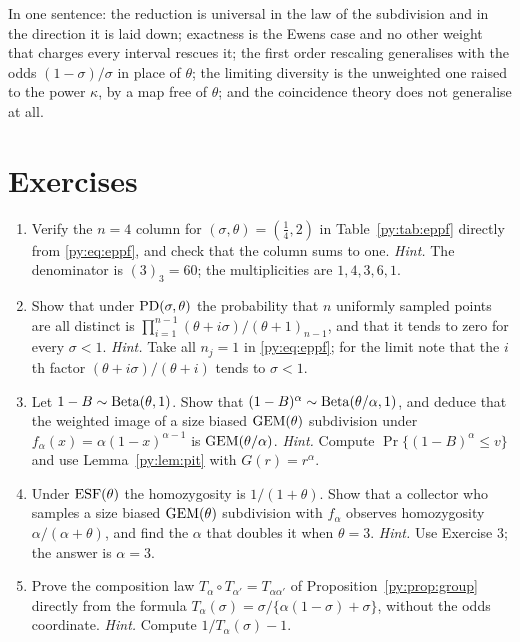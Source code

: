 In one sentence: the reduction is universal in the law of the subdivision and in the direction it
is laid down; exactness is the Ewens case and no other weight that charges every interval rescues it; the first order rescaling
generalises with the odds $(1-\sigma)/\sigma$ in place of $\theta$; the limiting diversity is the
unweighted one raised to the power $\kappa$, by a map free of $\theta$; and the coincidence theory
does not generalise at all.

\section{Exercises}
\label{py:sec:exercises}

\begin{enumerate}[label=\arabic*., leftmargin=*]
\item Verify the $n = 4$ column for $(\sigma,\theta) = (\tfrac14,2)$ in Table~\ref{py:tab:eppf}
directly from \eqref{py:eq:eppf}, and check that the column sums to one.
\emph{Hint.} The denominator is $(3)_3 = 60$; the multiplicities are $1, 4, 3, 6, 1$.

\item Show that under $\mathrm{PD}(\sigma,\theta)$ the probability that $n$ uniformly sampled points are all
distinct is $\prod_{i=1}^{n-1}(\theta+i\sigma)/(\theta+1)_{n-1}$, and that it tends to zero for
every $\sigma < 1$.
\emph{Hint.} Take all $n_j = 1$ in \eqref{py:eq:eppf}; for the limit note that the
$i$th factor $(\theta+i\sigma)/(\theta+i)$ tends to $\sigma < 1$.

\item Let $1-B \sim \mathrm{Beta}(\theta,1)$. Show that $(1-B)^{\alpha} \sim \mathrm{Beta}(\theta/\alpha,1)$, and
deduce that the weighted image of a size biased $\mathrm{GEM}(\theta)$ subdivision under
$f_\alpha(x) = \alpha(1-x)^{\alpha-1}$ is $\mathrm{GEM}(\theta/\alpha)$.
\emph{Hint.} Compute $\Pr\{(1-B)^{\alpha} \le v\}$ and use Lemma~\ref{py:lem:pit} with
$G(r) = r^{\alpha}$.

\item Under $\mathrm{ESF}(\theta)$ the homozygosity is $1/(1+\theta)$. Show that a collector who samples a
size biased $\mathrm{GEM}(\theta)$ subdivision with $f_\alpha$ observes homozygosity $\alpha/(\alpha+\theta)$,
and find the $\alpha$ that doubles it when $\theta = 3$.
\emph{Hint.} Use Exercise 3; the answer is $\alpha = 3$.

\item Prove the composition law $T_\alpha\circ T_{\alpha'} = T_{\alpha\alpha'}$ of
Proposition~\ref{py:prop:group} directly from the formula
$T_\alpha(\sigma) = \sigma/\{\alpha(1-\sigma)+\sigma\}$, without the odds coordinate.
\emph{Hint.} Compute $1/T_\alpha(\sigma) - 1$.


\end{enumerate}
